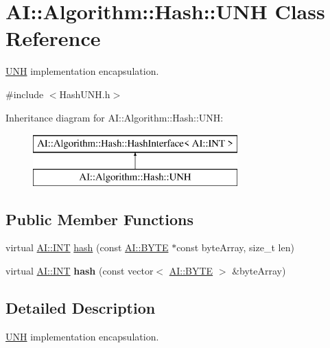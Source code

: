 \hypertarget{classAI_1_1Algorithm_1_1Hash_1_1UNH}{\section{A\+I\+:\+:Algorithm\+:\+:Hash\+:\+:U\+N\+H Class Reference}
\label{classAI_1_1Algorithm_1_1Hash_1_1UNH}
}


\hyperlink{classAI_1_1Algorithm_1_1Hash_1_1UNH}{U\+N\+H} implementation encapsulation.  




{\ttfamily \#include $<$Hash\+U\+N\+H.\+h$>$}

Inheritance diagram for A\+I\+:\+:Algorithm\+:\+:Hash\+:\+:U\+N\+H\+:\begin{figure}[H]
\begin{center}
\leavevmode
\includegraphics[height=2.000000cm]{classAI_1_1Algorithm_1_1Hash_1_1UNH}
\end{center}
\end{figure}
\subsection*{Public Member Functions}
\begin{DoxyCompactItemize}
\item 
virtual \hyperlink{namespaceAI_ac74584e573f07aa4194b461b1ba7be64}{A\+I\+::\+I\+N\+T} \hyperlink{classAI_1_1Algorithm_1_1Hash_1_1UNH_acc52e3c2f323e748882ee5d9d66be698}{hash} (const \hyperlink{namespaceAI_a9d4bcda82fe0f9aac3c4861e24491581}{A\+I\+::\+B\+Y\+T\+E} $\ast$const byte\+Array, size\+\_\+t len)
\item 
\hypertarget{classAI_1_1Algorithm_1_1Hash_1_1UNH_aacaaa8356755304f4bc1455cf18f16df}{virtual \hyperlink{namespaceAI_ac74584e573f07aa4194b461b1ba7be64}{A\+I\+::\+I\+N\+T} {\bfseries hash} (const vector$<$ \hyperlink{namespaceAI_a9d4bcda82fe0f9aac3c4861e24491581}{A\+I\+::\+B\+Y\+T\+E} $>$ \&byte\+Array)}\label{classAI_1_1Algorithm_1_1Hash_1_1UNH_aacaaa8356755304f4bc1455cf18f16df}

\end{DoxyCompactItemize}


\subsection{Detailed Description}
\hyperlink{classAI_1_1Algorithm_1_1Hash_1_1UNH}{U\+N\+H} implementation encapsulation. 

